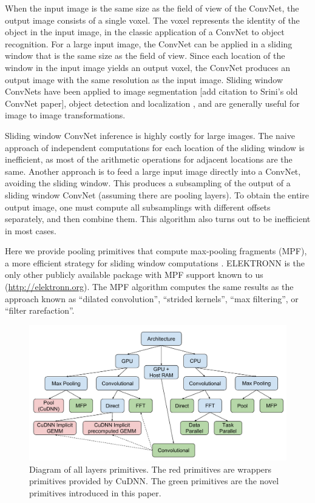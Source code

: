 \documentclass[conference]{./IEEEtran/IEEEtran}
\begin{document}
When the input image is the same size as the field of view of the
ConvNet, the output image consists of a single voxel.  The voxel
represents the identity of the object in the input image, in the
classic application of a ConvNet to object recognition. For a large
input image, the ConvNet can be applied in a sliding window that is
the same size as the field of view.  Since each location of the window
in the input image yields an output voxel, the ConvNet produces an
output image with the same resolution as the input image.  Sliding
window ConvNets have been applied to image
segmentation [add citation to Srini's old ConvNet paper]\cite{ciresan2012deep}, object detection and
localization \cite{sermanet2013overfeat}, and are generally useful for
image to image transformations.

Sliding window ConvNet inference is highly costly for large images.
The naive approach of independent computations for each location of
the sliding window is inefficient, as most of the arithmetic
operations for adjacent locations are the same.  Another approach is
to feed a large input image directly into a ConvNet, avoiding the
sliding window. This produces a subsampling of the output of a sliding
window ConvNet (assuming there are pooling layers).  To obtain the
entire output image, one must compute all subsamplings with different
offsets separately, and then combine them.  This algorithm also turns
out to be inefficient in most cases.

Here we provide pooling primitives that compute max-pooling fragments
(MPF), a more efficient strategy for sliding window
computations \cite{giusti2013fast, masci2013fast}.  ELEKTRONN is the
only other publicly available package with MPF support known to us
(\url{http://elektronn.org}).  The MPF algorithm computes
the same results as the approach known as ``dilated
convolution''\cite{yu2015multi}, ``strided
kernels''\cite{tschopp2015efficient}, ``max
filtering''\cite{zlateski2015znn}, or ``filter
rarefaction''\cite{long2015fully}.

  \begin{figure}
    \begin{center}
      \includegraphics[width=0.99\columnwidth]{fig/alllayersram.pdf}
    \end{center}
    \caption{Diagram of all layers primitives.  The red primitives are
      wrappers primitives provided by CuDNN.  The green primitives are
      the novel primitives introduced in this paper.}
    \label{fig:layers}
  \end{figure}
\end{document}

